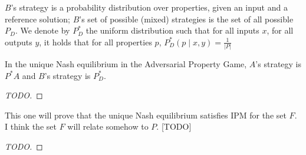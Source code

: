 $B$'s strategy is a probability distribution over properties, given an input and a reference solution; $B$'s set of possible (mixed) strategies is the set of all possible $P_D$.
We denote by $P^*_D$ the uniform distribution such that for all inputs $x$, for all outputs $y$, it holds that for all properties $p$, $P^*_D(p \mid x, y) = \frac{1}{|P|}$


\begin{theorem} \label{thm:ne}
In the unique Nash equilibrium in the Adversarial Property Game, $A$'s strategy is $P^*A$ and $B$'s strategy is $P^*_D$.
\end{theorem}
\begin{proof}
[TODO]
\end{proof}

\begin{theorem} \label{thm:ipm}
This one will prove that the unique Nash equilibrium satisfies IPM for the set $F$. I think the set $F$ will relate somehow to $P$. [TODO]
\end{theorem}
\begin{proof}
[TODO]
\end{proof}
